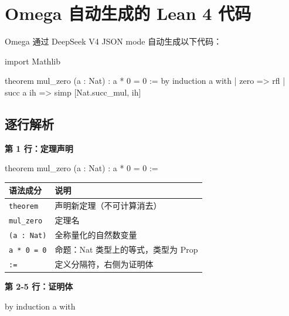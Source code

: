 \documentclass[
  11pt,
  a4paper,
]{ctexrep}
\newenvironment{Shaded}{\begin{snugshade}}{\end{snugshade}}
\newcommand{\NormalTok}[1]{\textcolor[rgb]{0.00,0.23,0.31}{#1}}
\newcounter{none} %
\begin{document}
\section{Omega 自动生成的 Lean 4 代码}\label{sec-lean-code}

Omega 通过 DeepSeek V4 JSON mode 自动生成以下代码：

\begin{Shaded}
\begin{Highlighting}[]
\NormalTok{import Mathlib}

\NormalTok{theorem mul\_zero (a : Nat) : a * 0 = 0 :=}
\NormalTok{by}
\NormalTok{  induction a with}
\NormalTok{  | zero =\textgreater{} rfl}
\NormalTok{  | succ a ih =\textgreater{}}
\NormalTok{    simp [Nat.succ\_mul, ih]}
\end{Highlighting}
\end{Shaded}

\subsection{逐行解析}\label{ux9010ux884cux89e3ux6790}

\textbf{第 1 行：定理声明}

\begin{Shaded}
\begin{Highlighting}[]
\NormalTok{theorem mul\_zero (a : Nat) : a * 0 = 0 :=}
\end{Highlighting}
\end{Shaded}

{\def\LTcaptype{none} %
\begin{longtable}[]{@{}ll@{}}
\toprule\noalign{}
语法成分 & 说明 \\
\midrule\noalign{}
\endhead
\bottomrule\noalign{}
\endlastfoot
\texttt{theorem} & 声明新定理（不可计算消去） \\
\texttt{mul\_zero} & 定理名 \\
\texttt{(a\ :\ Nat)} & 全称量化的自然数变量 \\
\texttt{a\ *\ 0\ =\ 0} & 命题：Nat 类型上的等式，类型为 Prop \\
\texttt{:=} & 定义分隔符，右侧为证明体 \\
\end{longtable}
}

\textbf{第 2-5 行：证明体}

\begin{Shaded}
\begin{Highlighting}[]
\NormalTok{by}
\NormalTok{  induction a with}
\end{Highlighting}
\end{Shaded}
\end{document}
